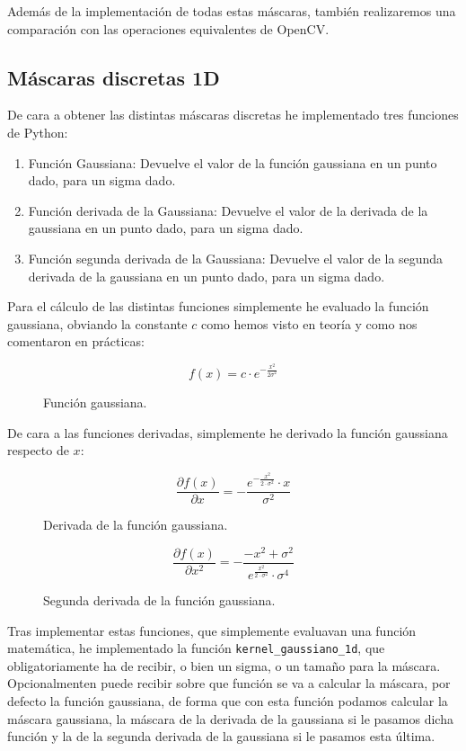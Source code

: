\documentclass[12pt, spanish]{article}
\begin{document}
Además de la implementación de todas estas máscaras, también realizaremos una comparación con las operaciones equivalentes de OpenCV.

\subsection{Máscaras discretas 1D}

De cara a obtener las distintas máscaras discretas he implementado tres funciones de Python:

\begin{enumerate}
	\item Función Gaussiana: Devuelve el valor de la función gaussiana en un punto dado, para un sigma dado.
	\item Función derivada de la Gaussiana: Devuelve el valor de la derivada de la gaussiana en un punto dado, para un sigma dado.
	\item Función segunda derivada de la Gaussiana: Devuelve el valor de la segunda derivada de la gaussiana en un punto dado, para un sigma dado.
\end{enumerate}


Para el cálculo de las distintas funciones simplemente he evaluado la función gaussiana, obviando la constante $c$ como hemos visto en teoría y como nos comentaron en prácticas:

\begin{figure}[H]
	\centering
	\[ f(x) = c \cdot e^{- \frac{x^2}{2\sigma^2}} \]
	\caption{Función gaussiana.}
	\label{f_gaussiana}
\end{figure}

\newpage

De cara a las funciones derivadas, simplemente he derivado la función gaussiana respecto de $x$:


\begin{figure}[H]
	\centering
	\[ \frac{\partial{f(x)}}{\partial{x}} = -\frac{e^{ -\frac{x^2}{2 \cdot \sigma^2} } \cdot x}{\sigma^2} \]
	\caption{Derivada de la función gaussiana.}
	\label{d_f_gaussiana}
\end{figure}

\begin{figure}[H]
	\centering
	\[ \frac{\partial{f(x)}}{\partial{x^2}} = -\frac{- x^2 + \sigma^2}{e^{ \frac{x^2}{2 \cdot \sigma^2} } \cdot \sigma^4} \]
	\caption{Segunda derivada de la función gaussiana.}
	\label{2d_f_gaussiana}
\end{figure}


Tras implementar estas funciones, que simplemente evaluavan una función matemática, he implementado la función \texttt{kernel\_gaussiano\_1d}, que obligatoriamente ha de recibir, o bien un sigma, o un tamaño para la máscara. Opcionalmenten puede recibir sobre que función se va a calcular la máscara, por defecto la función gaussiana, de forma que con esta función podamos calcular la máscara gaussiana, la máscara de la derivada de la gaussiana si le pasamos dicha función y la de la segunda derivada de la gaussiana si le pasamos esta última.
\end{document}
